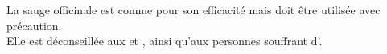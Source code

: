 \begin{Remarque}

    La sauge officinale est connue pour son efficacité mais doit être utilisée avec précaution. \\
    Elle est déconseillée aux  et , ainsi qu'aux personnes souffrant d'. 

\end{Remarque}